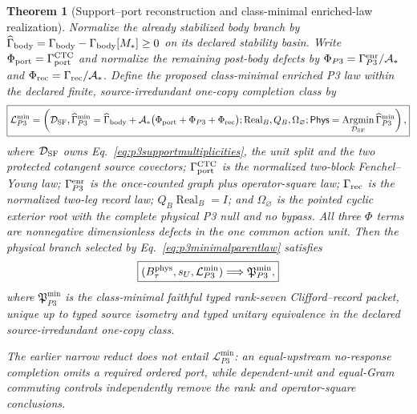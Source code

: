 \documentclass[11pt]{article}
\newtheorem{theorem}{Theorem}
\begin{document}
\begin{theorem}[Support--port reconstruction and class-minimal enriched-law realization]
Normalize the already stabilized body branch by
$\widehat\Gamma_{\rm body}
=\Gamma_{\rm body}-\Gamma_{\rm body}[M_*]\geq0$ on its declared stability
basin.  Write $\Phi_{\rm port}=\Gamma_{\rm port}^{\rm CTC}$ and normalize the
remaining post-body defects by
$\Phi_{P3}=\Gamma_{P3}^{\rm enr}/\mathcal A_*$ and
$\Phi_{\rm rec}=\Gamma_{\rm rec}/\mathcal A_*$.  Define the proposed
class-minimal enriched P3 law within the declared finite,
source-irredundant one-copy completion class by
\begin{equation}
 \boxed{
 \mathcal L_{P3}^{\min}
 =\left(
 \mathcal D_{\rm SF},
 \widehat\Gamma_{P3}^{\min}
 =\widehat\Gamma_{\rm body}
 +\mathcal A_*\bigl(
   \Phi_{\rm port}+\Phi_{P3}+\Phi_{\rm rec}\bigr);
 \operatorname{Real}_B,Q_B,\Omega_\varnothing;
 \mathsf{Phys}=\operatorname*{Argmin}_{\mathcal D_{\rm SF}}
 \widehat\Gamma_{P3}^{\min}
 \right),}
 \label{eq:p3minimalparentlaw}
\end{equation}
where $\mathcal D_{\rm SF}$ owns
Eq.~\eqref{eq:p3supportmultiplicities}, the unit split and the two protected
cotangent source covectors;
$\Gamma_{\rm port}^{\rm CTC}$ is the normalized two-block
Fenchel--Young law; $\Gamma_{P3}^{\rm enr}$ is the once-counted graph plus
operator-square law; $\Gamma_{\rm rec}$ is the normalized two-leg record
law; $Q_B\operatorname{Real}_B=I$; and $\Omega_\varnothing$ is the pointed
cyclic exterior root with the complete physical P3 null and no bypass.  All
three $\Phi$ terms are nonnegative dimensionless defects in the one common
action unit.  Then the physical branch selected by
Eq.~\eqref{eq:p3minimalparentlaw} satisfies
\begin{equation}
 \boxed{
 (B_\tau^{\rm phys},s_U,\mathcal L_{P3}^{\min})
 \Longrightarrow \mathfrak P_{P3}^{\min},}
 \label{eq:p3minimalparentarrow}
\end{equation}
where $\mathfrak P_{P3}^{\min}$ is the class-minimal faithful typed rank-seven
Clifford--record packet, unique up to typed source isometry and typed unitary
equivalence in the declared source-irredundant one-copy class.

The earlier narrow reduct does not entail
$\mathcal L_{P3}^{\min}$: an equal-upstream no-response completion omits a
required ordered port, while dependent-unit and equal-Gram commuting controls
independently remove the rank and operator-square conclusions.
\end{theorem}
\end{document}
